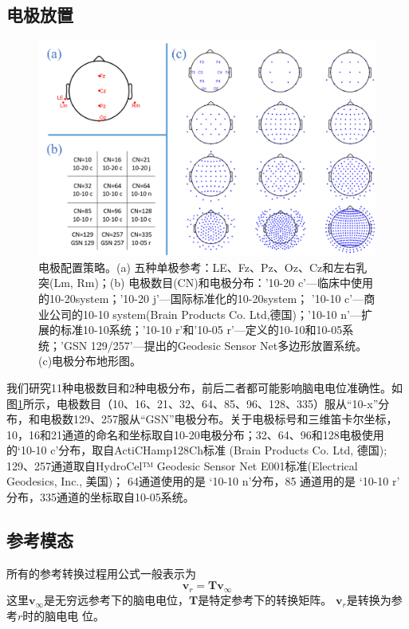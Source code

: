 \subsection{电极放置}
\begin{figure}[h!]
	\centering
	\includegraphics[width=15cm]{pic/JNE/figure2.png}
	\caption{电极配置策略。(a) 五种单极参考：LE、Fz、Pz、Oz、Cz和左右乳突(Lm, Rm)；(b) 电极数目(CN)和电极分布：'10-20 c'—临床中使用的10-20system；'10-20 j'—国际标准化的10-20system； '10-10 c'—商业公司的10-10 system(Brain Products Co. Ltd,德国)；'10-10 n'—\cite{nuwer_m_r_ifcn_1998}扩展的标准10-10系统；'10-10 r'和'10-05 r'—\cite{oostenveld_r_and_praamstra_p_five_2001}定义的10-10和10-05系统；'GSN 129/257'—\cite{tucker_d_m_spatial_1993}提出的Geodesic Sensor Net多边形放置系统。(c)电极分布地形图。}
	\label{2.2}
\end{figure}
我们研究11种电极数目和2种电极分布，前后二者都可能影响脑电电位准确性。如图\ref{2.2}所示，电极数目（10、16、21、32、64、85、96、128、335）服从“10-x”分布，和电极数129、257服从“GSN”电极分布。关于电极标号和三维笛卡尔坐标，10，16和21通道的命名和坐标取自10-20电极分布；32、64、96和128电极使用的‘10-10 c’分布，取自ActiCHamp128Ch标准 (Brain Products Co. Ltd, 德国); 129、257通道取自HydroCel™ Geodesic Sensor Net E001标准(Electrical Geodesics, Inc., 美国)； 64通道使用的是 ‘10-10 n’分布，85
通道用的是 ‘10-10 r’ 分布，335通道的坐标取自10-05系统。
\subsection{参考模态}
所有的参考转换过程用公式一般表示为
\begin{equation}\label{eq2.3}
\mathbf{v}_r=\mathbf{Tv}_{\infty}
\end{equation}
这里$\mathbf{v}_{\infty}$是无穷远参考下的脑电电位，$\mathbf{T}$是特定参考下的转换矩阵。 $\mathbf{v}_r$是转换为参考$r$时的脑电电
位。
